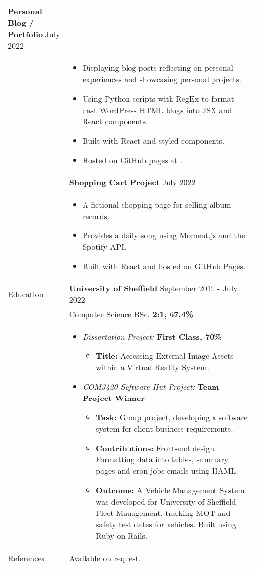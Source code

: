 \documentclass[12pt]{article}
\begin{document}
\begin{minipage}[t][0pt]{\linewidth}
\begin{tabular}[t]{p{2cm} p{14cm}}
		\textbf{Personal Blog / Portfolio}  \hfill July 2022 \\ &
		\begin{itemize}
			\renewcommand{\labelitemi}{$\diamond$}
			\item Displaying blog posts reflecting on personal experiences and showcasing personal projects.
			\item Using Python scripts with RegEx to format past WordPress HTML blogs into JSX and React components.
			\item Built with React and styled components. 
			\item Hosted on GitHub pages at \href{jluong23.github.io/blog}{\color{Blue}{jluong23.github.io/blog}}.
		\end{itemize} \\ &
		
		\textbf{Shopping Cart Project}  \hfill July 2022 \\ &
		\begin{itemize}
			\renewcommand{\labelitemi}{$\diamond$}
			\item A fictional shopping page for selling album records. 
			\item Provides a daily song using Moment.js and the Spotify API.
			\item Built with React and hosted on GitHub Pages.
		\end{itemize} \\
	{Education} &
		\textbf{University of Sheffield} \hfill September 2019 - July 2022 \\ &
		Computer Science BSc. \hfill \textbf{2:1, 67.4\%}  \\ &
	    \begin{itemize}
    		\renewcommand{\labelitemi}{$\diamond$}
			\item \textit{Dissertation Project:} \hfill \textbf{First Class, 70\%} 
			\begin{itemize}
				\renewcommand{\labelitemii}{$\cdot$}
				\item \textbf{Title:} Accessing External Image Assets within a Virtual Reality System.
			\end{itemize}
			\item \textit{COM3420 Software Hut Project:} \hfill \textbf{Team Project Winner} 
			\begin{itemize}
				\renewcommand{\labelitemii}{$\cdot$}
				\item \textbf{Task:} Group project, developing a software system for client business requirements.
				\item \textbf{Contributions:} Front-end design. Formatting data into tables, summary pages and cron jobs emails using HAML. 
				\item \textbf{Outcome:} A Vehicle Management System was developed for University of Sheffield Fleet Management, tracking MOT and safety test
				dates for vehicles. Built using Ruby on Rails.
			\end{itemize}
		\end{itemize} \\

	{References} &
		Available on request.
\end{tabular}
\end{minipage}
\end{document}
